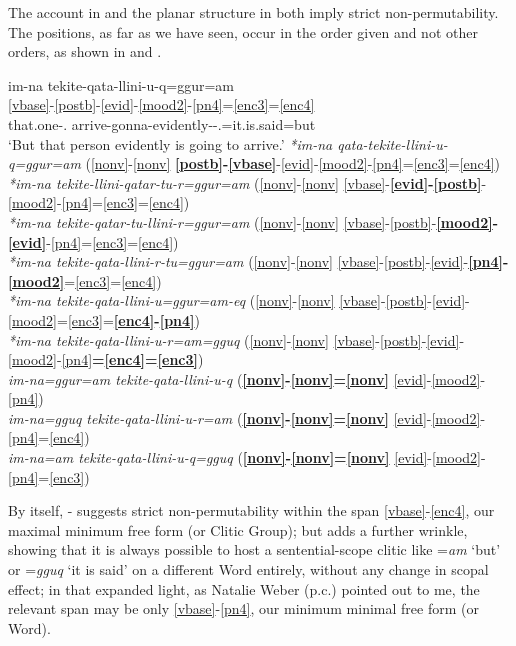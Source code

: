 \documentclass[output=paper]{langscibook}
\begin{document}
The account in  and the planar structure in  both imply strict non-permutability. The positions, as far as we have seen, occur in the order given and not other orders, as shown in  and .

\ea\label{ex:key:29}
 \ea\label{ex:key:29a}
 \glll im-na tekite-qata-llini-u-q=ggur=am\\
    [\ref{nonv}--] \ref{vbase}-\ref{postb}-\ref{evid}-\ref{mood2}-\ref{pn4}=\ref{enc3}=\ref{enc4}\\
     that.one-\Abs.\Sg{} arrive-gonna-evidently-\Ind{}-\Tsg.\Sarg{}=it.is.said=but\\
 \glt `But that person evidently is going to arrive.'
 \ex\label{ex:key:29b}
\textit{*im-na qata-tekite-llini-u-q=ggur=am} (\ref{nonv}-\ref{nonv} \textbf{\ref{postb}-\ref{vbase}}{}-\ref{evid}-\ref{mood2}-\ref{pn4}=\ref{enc3}=\ref{enc4})\\
 \textit{*im-na tekite-llini-qatar-tu-r=ggur=am} (\ref{nonv}-\ref{nonv} \ref{vbase}-\textbf{\ref{evid}-\ref{postb}}{}-\ref{mood2}-\ref{pn4}=\ref{enc3}=\ref{enc4})\\
 \textit{*im-na tekite-qatar-tu-llini-r=ggur=am} (\ref{nonv}-\ref{nonv} \ref{vbase}-\ref{postb}-\textbf{\ref{mood2}-\ref{evid}}{}-\ref{pn4}=\ref{enc3}=\ref{enc4})\\
 \textit{*im-na tekite-qata-llini-r-tu=ggur=am} (\ref{nonv}-\ref{nonv} \ref{vbase}-\ref{postb}-\ref{evid}-\textbf{\ref{pn4}-\ref{mood2}}=\ref{enc3}=\ref{enc4})\\
 \textit{*im-na tekite-qata-llini-u=ggur=am-eq} (\ref{nonv}-\ref{nonv} \ref{vbase}-\ref{postb}-\ref{evid}-\ref{mood2}=\ref{enc3}=\textbf{\ref{enc4}-\ref{pn4}})\\
 \textit{*im-na tekite-qata-llini-u-r=am=gguq} (\ref{nonv}-\ref{nonv} \ref{vbase}-\ref{postb}-\ref{evid}-\ref{mood2}-\ref{pn4}\textbf{=\ref{enc4}=\ref{enc3}})\\
 \ex\label{ex:key:29c}
 \textit{im-na=ggur=am tekite-qata-llini-u-q} (\textbf{\ref{nonv}-\ref{nonv}=\ref{nonv}} \ref{evid}-\ref{mood2}-\ref{pn4})\\
 \textit{im-na=gguq tekite-qata-llini-u-r=am} (\textbf{\ref{nonv}-\ref{nonv}=\ref{nonv}} \ref{evid}-\ref{mood2}-\ref{pn4}=\ref{enc4})\\
 \textit{im-na=am tekite-qata-llini-u-q=gguq} (\textbf{\ref{nonv}-\ref{nonv}=\ref{nonv}} \ref{evid}-\ref{mood2}-\ref{pn4}=\ref{enc3})\\
 \z
\z


By itself, - suggests strict non-permutability within the span \ref{vbase}-\ref{enc4}, our maximal minimum free form (or Clitic Group); but  adds a further wrinkle, showing that it is always possible to host a sentential-scope clitic like =\textit{am} `but' or =\textit{gguq} `it is said' on a different Word entirely, without any change in scopal effect; in that expanded light, as Natalie Weber (p.c.) pointed out to me, the relevant span may be only \ref{vbase}-\ref{pn4}, our minimum minimal free form (or Word).
\end{document}
